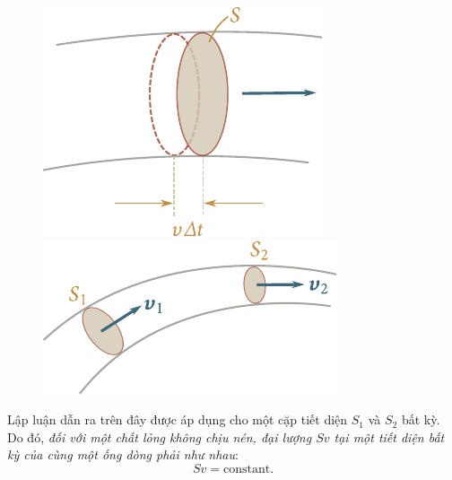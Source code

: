 \begin{figure}[!htb]
	\begin{minipage}[t]{0.5\linewidth}
		\begin{center}
			\includegraphics[scale=1.0]{figures/ch_09/fig_9_2.pdf}
			\caption[]{}
			\label{fig:9_2}
		\end{center}
	\end{minipage}
	\hspace{-0.0cm}
	\begin{minipage}[t]{0.5\linewidth}
		\begin{center}
			\includegraphics[scale=1.0]{figures/ch_09/fig_9_3.pdf}
			\caption[]{}
			\label{fig:9_3}
		\end{center}
	\end{minipage}
	\vspace{-0.0cm}
\end{figure}


Lập luận dẫn ra trên đây được áp dụng cho một cặp tiết diện $S_1$ và $S_2$ bất kỳ. Do đó, \textit{đối với một chất lỏng không chịu nén, đại lượng $Sv$ tại một tiết diện bất kỳ của cùng một ống dòng phải như nhau}:
\begin{equation}\label{eq:9_1}
	Sv = \text{constant}.
\end{equation}


